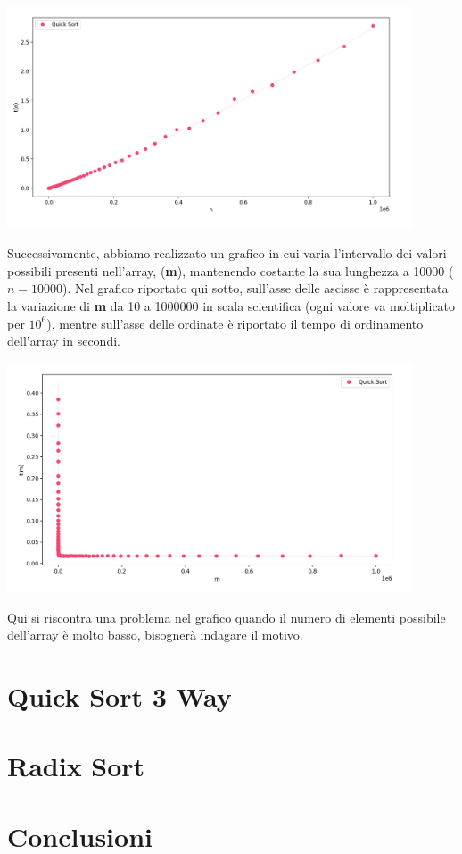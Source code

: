\documentclass[a4paper, 12pt, oneside]{book}
\begin{document}
\begin{center}
	\includegraphics[width=0.9\textwidth]{images/grafico_quick_sort_n.png}
\end{center}

\noindent Successivamente, abbiamo realizzato un grafico in cui varia l'intervallo dei valori possibili presenti nell'array, (\textbf{m}), mantenendo costante la sua lunghezza a 10000 (\(n=10000\)). Nel grafico riportato qui sotto, sull'asse delle ascisse è rappresentata la variazione di \textbf{m} da 10 a 1000000 in scala scientifica (ogni valore va moltiplicato per \(10^6\)), mentre sull'asse delle ordinate è riportato il tempo di ordinamento dell'array in secondi.
 
\begin{center}
	\includegraphics[width=0.9\textwidth]{images/grafico_quick_sort_m.png}
\end{center}

\noindent Qui si riscontra una problema nel grafico quando il numero di elementi possibile dell'array è molto basso, bisognerà indagare il motivo.

\chapter*{Quick Sort 3 Way}



\chapter*{Radix Sort}

\chapter*{Conclusioni}
\end{document}
